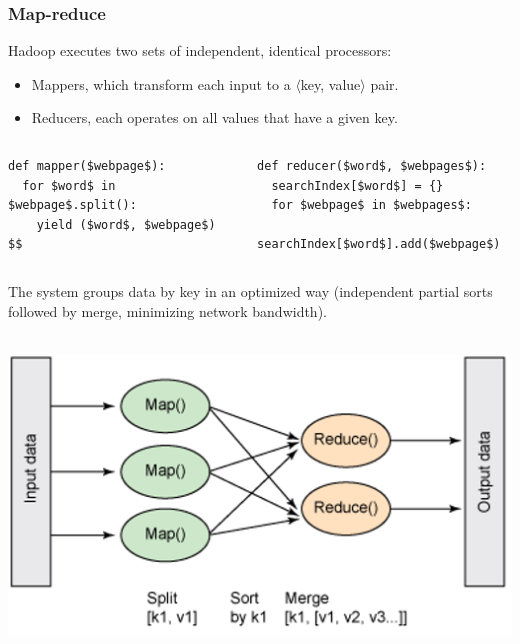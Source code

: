 \documentclass{beamer}
\begin{document}
\begin{frame}[fragile]
\frametitle{Map-reduce}

Hadoop executes two sets of independent, identical processors:
\begin{itemize}
\item Mappers, which transform each input to a $\langle$key, value$\rangle$ pair.
\item Reducers, each operates on all values that have a given key.
\end{itemize}

\vspace{-0.1 cm}
\begin{columns}
\begin{lstlisting}[frame=single]
def mapper($webpage$):
  for $word$ in $webpage$.split():
    yield ($word$, $webpage$)
$$
\end{lstlisting}
\begin{lstlisting}[frame=single]
def reducer($word$, $webpages$):
  searchIndex[$word$] = {}
  for $webpage$ in $webpages$:
    searchIndex[$word$].add($webpage$)
\end{lstlisting}
\end{columns}

The system groups data by key in an optimized way (independent partial sorts followed by merge, minimizing network bandwidth).

\vspace{0.2 cm}
\mbox{ } \hfill \includegraphics[width=0.6\linewidth]{mapreduce-diagram-by-ibm.png} \hfill \mbox{ }
\end{frame}
\end{document}

